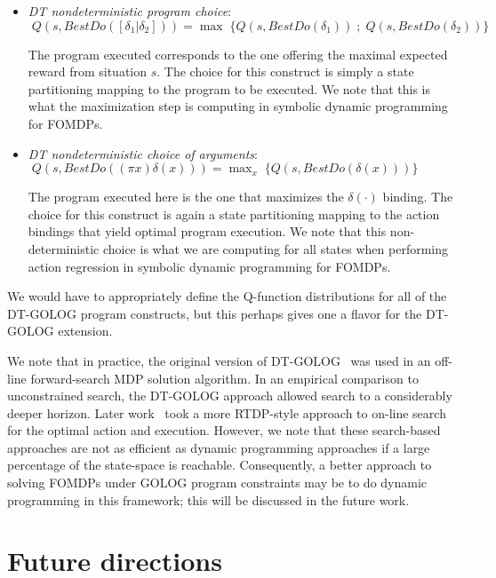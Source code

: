 \begin{itemize}

\item \emph{DT nondeterministic program choice}:  $\; Q(s,BestDo([\delta_1 | \delta_2])) = \max \; \{ Q(s,BestDo(\delta_1)) \; ; \; Q(s,BestDo(\delta_2)) \}$

The program executed corresponds to the one offering the maximal
expected reward from situation $s$.  The choice for this construct
is simply a state partitioning mapping to the
program to be executed.  We note that this is what the
maximization step is computing in symbolic dynamic programming for
FOMDPs.

\item \emph{DT nondeterministic choice of arguments}: $\; Q(s,BestDo((\pi x) \delta(x))) = \max_{x} \; \{ Q(s,BestDo(\delta(x))) \}$

The program executed here is the one that maximizes the $\delta(\cdot)$
binding.  The choice for this construct is again a state
partitioning mapping to the action bindings that yield optimal program
execution.  We note that this non-deterministic choice is what we are
computing for all states when performing action regression in symbolic
dynamic programming for FOMDPs.

\end{itemize}

We would have to appropriately define the Q-function
distributions for all of the DT-GOLOG program constructs, but this perhaps gives
one a flavor for the DT-GOLOG extension.

We note that in practice, the original version of
DT-GOLOG~\cite{dtgolog} was used in an off-line forward-search MDP
solution algorithm.  In an empirical comparison to unconstrained
search, the DT-GOLOG approach allowed search to a considerably deeper
horizon.  Later work~\cite{dtgolog2} took a more RTDP-style
approach to on-line search for the optimal action and execution.
However, we note that these search-based approaches are not as efficient
as dynamic programming approaches if a large percentage of the state-space
is reachable.  Consequently, a better approach to solving FOMDPs under
GOLOG program constraints may be to do dynamic programming in this framework;
this will be discussed in the future work.


\newpage

\section{Future directions}

